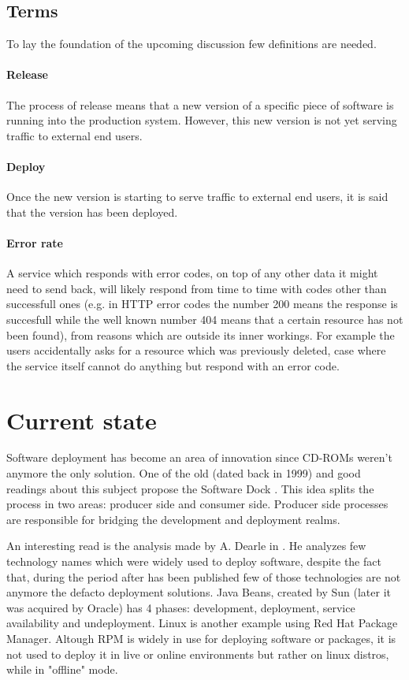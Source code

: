 \documentclass[conference]{IEEEtran}
\begin{document}
\subsection{Terms}
    To lay the foundation of the upcoming discussion few definitions are needed.
\paragraph{Release}
    The process of release means that a new version of a specific piece of software is running into the production system. However, this new version is not yet serving traffic to external end users.
\paragraph{Deploy}
    Once the new version is starting to serve traffic to external end users, it is said that the version has been deployed.
\paragraph{Error rate}
    A service which responds with error codes, on top of any other data it might need to send back, will likely respond from time to time with codes other than successfull ones (e.g. in HTTP error codes the number 200 means the response is succesfull while the well known number 404 means that a certain resource has not been found), from reasons which are outside its inner workings. For example the users accidentally asks for a resource which was previously deleted, case where the service itself cannot do anything but respond with an error code.

\section{Current state}
    Software deployment has become an area of innovation since CD-ROMs weren't anymore the only solution. One of the old (dated back in 1999) and good readings about this subject propose the Software Dock \cite{b1}. This idea splits the process in two areas: producer side and consumer side. Producer side processes are responsible for bridging the development and deployment realms.

    An interesting read is the analysis made by A. Dearle in \cite{b3}. He analyzes few technology names which were widely used to deploy software, despite the fact that, during the period after \cite{b3} has been published few of those technologies are not anymore the defacto deployment solutions. Java Beans, created by Sun (later it was acquired by Oracle) has 4 phases: development, deployment, service availability and undeployment. Linux is another example using Red Hat Package Manager. Altough RPM is widely in use for deploying software or packages, it is not used to deploy it in live or online environments but rather on linux distros, while in "offline" mode.
\end{document}
